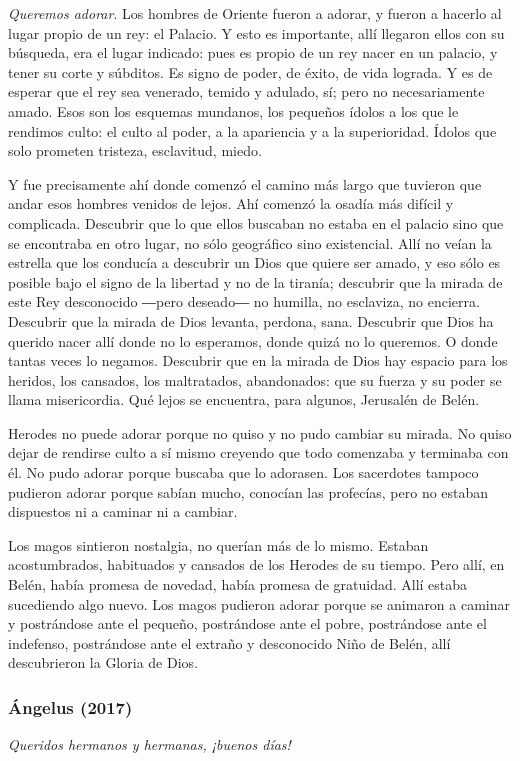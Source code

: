 \emph{Queremos adorar}. Los hombres de Oriente fueron a adorar, y fueron a hacerlo al lugar propio de un rey: el Palacio. Y esto es importante, allí llegaron ellos con su búsqueda, era el lugar indicado: pues es propio de un rey nacer en un palacio, y tener su corte y súbditos. Es signo de poder, de éxito, de vida lograda. Y es de esperar que el rey sea venerado, temido y adulado, sí; pero no necesariamente amado. Esos son los esquemas mundanos, los pequeños ídolos a los que le rendimos culto: el culto al poder, a la apariencia y a la superioridad. Ídolos que solo prometen tristeza, esclavitud, miedo.

Y fue precisamente ahí donde comenzó el camino más largo que tuvieron que andar esos hombres venidos de lejos. Ahí comenzó la osadía más difícil y complicada. Descubrir que lo que ellos buscaban no estaba en el palacio sino que se encontraba en otro lugar, no sólo geográfico sino existencial. Allí no veían la estrella que los conducía a descubrir un Dios que quiere ser amado, y eso sólo es posible bajo el signo de la libertad y no de la tiranía; descubrir que la mirada de este Rey desconocido ―pero deseado― no humilla, no esclaviza, no encierra. Descubrir que la mirada de Dios levanta, perdona, sana. Descubrir que Dios ha querido nacer allí donde no lo esperamos, donde quizá no lo queremos. O donde tantas veces lo negamos. Descubrir que en la mirada de Dios hay espacio para los heridos, los cansados, los maltratados, abandonados: que su fuerza y su poder se llama misericordia. Qué lejos se encuentra, para algunos, Jerusalén de Belén.

Herodes no puede adorar porque no quiso y no pudo cambiar su mirada. No quiso dejar de rendirse culto a sí mismo creyendo que todo comenzaba y terminaba con él. No pudo adorar porque buscaba que lo adorasen. Los sacerdotes tampoco pudieron adorar porque sabían mucho, conocían las profecías, pero no estaban dispuestos ni a caminar ni a cambiar.

Los magos sintieron nostalgia, no querían más de lo mismo. Estaban acostumbrados, habituados y cansados de los Herodes de su tiempo. Pero allí, en Belén, había promesa de novedad, había promesa de gratuidad. Allí estaba sucediendo algo nuevo. Los magos pudieron adorar porque se animaron a caminar y postrándose ante el pequeño, postrándose ante el pobre, postrándose ante el indefenso, postrándose ante el extraño y desconocido Niño de Belén, allí descubrieron la Gloria de Dios.

\subsubsection{Ángelus (2017)} \emph{Queridos hermanos y hermanas, ¡buenos días!}


